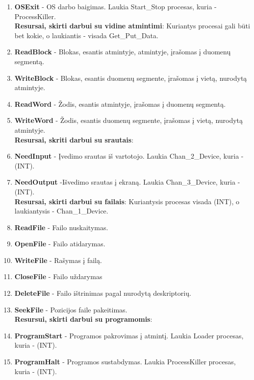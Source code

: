 		\begin{enumerate}
			\item \textbf{OSExit} - OS darbo baigimas. Laukia Start\_Stop procesas, kuria - ProcessKiller. \\
			
			\textbf{Resursai, skirti darbui su vidine atmintimi}: Kuriantys procesai gali būti bet kokie, o laukiantis - visada Get\_Put\_Data.
			
			\item \textbf{ReadBlock} - Blokas, esantis atmintyje, atmintyje, įrašomas į duomenų segmentą.
			\item \textbf{WriteBlock} - Blokas, esantis duomenų segmente, įrašomas į vietą, nurodytą atmintyje.
			\item \textbf{ReadWord} - Žodis, esantis atmintyje, įrašomas į duomenų segmentą.
			\item \textbf{WriteWord} - Žodis, esantis duomenų segmente, įrašomas į vietą, nurodytą atmintyje.\\
			
			\textbf{Resursai, skriti darbui su srautais}:
			
			\item \textbf{NeedInput} - Įvedimo srautas iš vartotojo. Laukia Chan\_2\_Device, kuria - (INT). 
			\item \textbf{NeedOutput} -Išvedimo srautas į ekraną.
			Laukia Chan\_3\_Device, kuria - (INT).\\
			
			\textbf{Resursai, skirti darbui su failais}: Kuriantysis procesas visada (INT), o laukiantysis - Chan\_1\_Device.
			
			\item \textbf{ReadFile} - Failo nuskaitymas.
			\item \textbf{OpenFile} - Failo atidarymas.
			\item \textbf{WriteFile} - Rašymas į failą.
			\item \textbf{CloseFile} - Failo uždarymas
			\item \textbf{DeleteFile} - Failo ištrinimas pagal nurodytą deskriptorių.
			\item \textbf{SeekFile} - Pozicijos faile pakeitimas.\\
			
			\textbf{Resursui, skirti darbui su programomis}:
			
			\item \textbf{ProgramStart} - Programos pakrovimas į atmintį. Laukia Loader procesas, kuria - (INT).
			\item \textbf{ProgramHalt} - Programos sustabdymas. Laukia ProcessKiller procesas, kuria - (INT).
			
		\end{enumerate}
		

